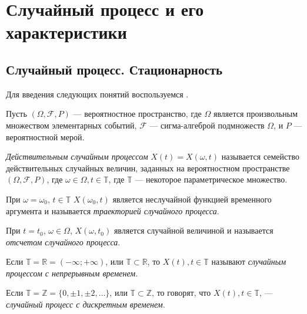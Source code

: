 
\newpage
\chapter{Случайный процесс и его характеристики}
\label{c:definitions}

\section{Случайный процесс. Стационарность}

Для введения следующих понятий воспользуемся \cite{brillinjer-ts, trush-ts}.

Пусть $ (\Omega, \mathcal{F}, P) $ --- вероятностное пространство, где $\Omega$ является произвольным множеством элементарных событий, $\mathcal{F}$ --- сигма-алгеброй подмножеств $\Omega$, и $P$ --- вероятностной мерой.

\begin{Definition}
\label{def:stochastic-process}
	\textit{Действительным случайным процессом} $ X(t) = X(\omega, t) $ называется семейство действительных случайных величин, заданных на вероятностном пространстве $ (\Omega, \mathcal{F}, P) $, где $ \omega \in \Omega, t \in \mathbb{T}$, где $ \mathbb{T} $ --- некоторое параметрическое множество.

	При $ \omega = \omega_{0} $, $ t \in \mathbb{T} $ $ X(\omega_{0}, t) $ является неслучайной функцией временного аргумента и называется \textit{траекторией случайного процесса}.

	При $ t = t_{0} $, $ \omega \in \Omega $, $ X(\omega, t_{0}) $ является случайной величиной и называется \textit{отсчетом случайного процесса}.
\end{Definition}

\begin{Definition}%
    Если $ \mathbb{T} = \mathbb{R} = (- \infty; + \infty) $, или $ \mathbb{T} \subset \mathbb{R}$, то $ X(t), t \in \mathbb{T} $ называют \textit{случайным процессом с непрерывным временем}.
\end{Definition}

\begin{Definition}
	Если $ \mathbb{T} = \mathbb{Z} = \{ 0, \pm 1, \pm 2, \dots \} $, или $ \mathbb{T} \subset \mathbb{Z} $, то говорят, что $ X(t), t \in \mathbb{T} $, --- \textit{случайный процесс с дискретным временем}.
\end{Definition}

